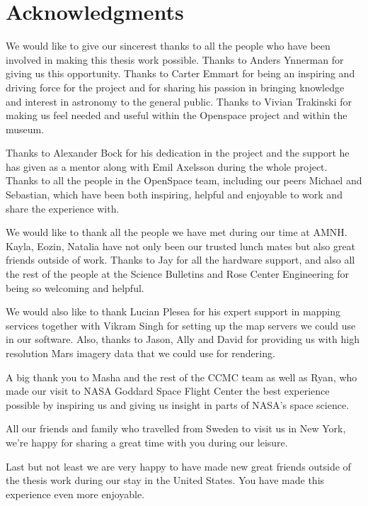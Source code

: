 \cleardoublepage
{}
{}
\chapter*{Acknowledgments}

We would like to give our sincerest thanks to all the people who have been involved in making this thesis work possible. Thanks to Anders Ynnerman for giving us this opportunity. Thanks to Carter Emmart for being an inspiring and driving force for the project and for sharing his passion in bringing knowledge and interest in astronomy to the general public. Thanks to Vivian Trakinski for making us feel needed and useful within the Openspace project and within the museum.

Thanks to Alexander Bock for his dedication in the project and the support he has given as a mentor along with Emil Axelsson during the whole project. Thanks to all the people in the OpenSpace team, including our peers Michael and Sebastian, which have been both inspiring, helpful and enjoyable to work and share the experience with.

We would like to thank all the people we have met during our time at AMNH. Kayla, Eozin, Natalia have not only been our trusted lunch mates but also great friends outside of work.
Thanks to Jay for all the hardware support, and also all the rest of the people at the Science Bulletins and Rose Center Engineering for being so welcoming and helpful.

We would also like to thank Lucian Plesea for his expert support in mapping services together with Vikram Singh for setting up the map servers we could use in our software. Also, thanks to Jason, Ally and David for providing us with high resolution Mars imagery data that we could use for rendering.

A big thank you to Masha and the rest of the CCMC team as well as Ryan, who made our visit to NASA Goddard Space Flight Center the best experience possible by inspiring us and giving us insight in parts of NASA's space science.

All our friends and family who travelled from Sweden to visit us in New York, we're happy for sharing a great time with you during our leisure. 

Last but not least we are very happy to have made new great friends outside of the thesis work during our stay in the United States. You have made this experience even more enjoyable.

\newpage
